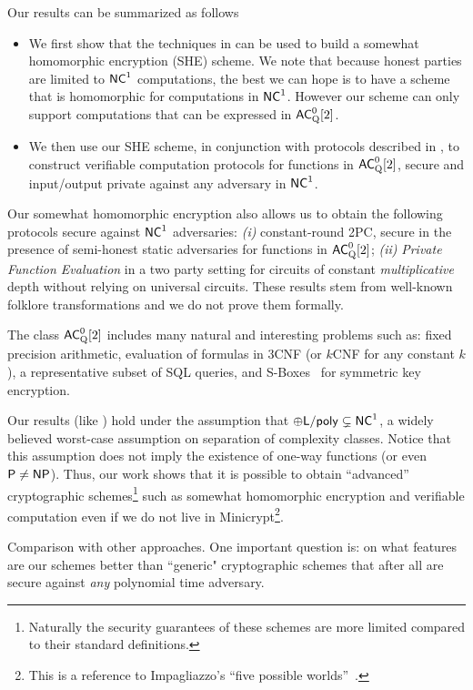 Our results can be summarized as follows
\begin{itemize}
\item We first show that the techniques in \cite{fgcrypto} can be used to build a somewhat homomorphic encryption (SHE) scheme. 
We note that because honest parties are limited to 
${\mathsf{NC}}^1$ computations, the best we can hope is to have a scheme that is homomorphic for computations in ${\mathsf{NC}}^1$. However our scheme can only support computations that can be expressed in 
${\mathsf{AC}}^0_{\text{Q}}[2]$. 

\item We then use our SHE scheme, in conjunction with protocols described in \cite{ggp10,ckv10,aik10}, to construct verifiable 
computation protocols for functions in ${\mathsf{AC}}^0_{\text{Q}}[2]$, secure and input/output private against any adversary in ${\mathsf{NC}}^1$.

\end{itemize}
Our somewhat homomorphic encryption also allows us to obtain the following protocols secure against ${\mathsf{NC}}^1$ adversaries: \textit{(i)} constant-round 2PC, secure in the presence of semi-honest static adversaries for functions in ${\mathsf{AC}}^0_{\text{Q}}[2]$; \textit{(ii)} \textit{Private Function Evaluation} in a two party setting for circuits of constant \textit{multiplicative} depth without relying on universal circuits. These results stem from well-known folklore transformations and we do not prove them formally.

The class ${\mathsf{AC}}^0_{\text{Q}}[2]$ includes many natural and interesting problems such as: fixed precision arithmetic, evaluation of formulas in 3CNF (or $k$CNF for any constant $k$), a representative subset of SQL queries, and S-Boxes~\cite{sboxes} for symmetric key encryption. 

Our results (like \cite{fgcrypto}) hold under the assumption that $\oplus {\ensuremath{\mathsf{L}}} / \mathsf{poly} \subsetneq {\ensuremath{\mathsf{NC}}}^1$, a widely believed worst-case assumption on separation of complexity classes. Notice that this assumption does not imply the existence of one-way functions (or even ${\mathsf{P}} \not = {\mathsf{NP}}$). Thus, our work shows that it is possible to obtain ``advanced'' cryptographic schemes\footnote{Naturally the security guarantees of these schemes are more limited compared to their standard definitions.} such as somewhat homomorphic encryption and verifiable computation even if we do not live in Minicrypt\footnote{This is a reference to Impagliazzo's ``five possible worlds''~\cite{impagliazzo1995personal}.}.

\medskip
\noindent
{\sc Comparison with other approaches.}
One important question is: on what features are our schemes better than ``generic" cryptographic schemes that after all are secure against {\em any} polynomial time  adversary. 

